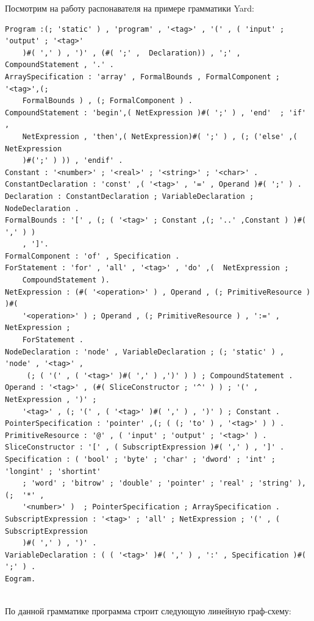 \documentclass[12pt]{article}
\begin{document}
Посмотрим на работу распонавателя на примере грамматики Yard:
\begin{verbatim}
Program :(; 'static' ) , 'program' , '<tag>' , '(' , ( 'input' ; 'output' ; '<tag>' 
	)#( ',' ) , ')' , (#( ';' ,  Declaration)) , ';' , CompoundStatement , '.' .
ArraySpecification : 'array' , FormalBounds , FormalComponent ; '<tag>',(; 	
	FormalBounds ) , (; FormalComponent ) . 
CompoundStatement : 'begin',( NetExpression )#( ';' ) , 'end'  ; 'if' , 	
	NetExpression , 'then',( NetExpression)#( ';' ) , (; ('else' ,( NetExpression 
	)#(';' ) )) , 'endif' .
Constant : '<number>' ; '<real>' ; '<string>' ; '<char>' .
ConstantDeclaration : 'const' ,( '<tag>' , '=' , Operand )#( ';' ) .
Declaration : ConstantDeclaration ; VariableDeclaration ; NodeDeclaration .
FormalBounds : '[' , (; ( '<tag>' ; Constant ,(; '..' ,Constant ) )#( ',' ) )
	, ']'.
FormalComponent : 'of' , Specification .
ForStatement : 'for' , 'all' , '<tag>' , 'do' ,(  NetExpression ; 
	CompoundStatement ).
NetExpression : (#( '<operation>' ) , Operand , (; PrimitiveResource ) )#(
	'<operation>' ) ; Operand , (; PrimitiveResource ) , ':=' , NetExpression ;
 	ForStatement .
NodeDeclaration : 'node' , VariableDeclaration ; (; 'static' ) , 'node' , '<tag>' ,
	 (; ( '(' , ( '<tag>' )#( ',' ) ,')' ) ) ; CompoundStatement .
Operand : '<tag>' , (#( SliceConstructor ; '^' ) ) ; '(' , NetExpression , ')' ;
 	'<tag>' , (; '(' , ( '<tag>' )#( ',' ) , ')' ) ; Constant . 
PointerSpecification : 'pointer' ,(; ( (; 'to' ) , '<tag>' ) ) .
PrimitiveResource : '@' , ( 'input' ; 'output' ; '<tag>' ) .
SliceConstructor : '[' , ( SubscriptExpression )#( ',' ) , ']' .
Specification : ( 'bool' ; 'byte' ; 'char' ; 'dword' ; 'int' ; 'longint' ; 'shortint'
 	; 'word' ; 'bitrow' ; 'double' ; 'pointer' ; 'real' ; 'string' ),(;  '*' ,
  	'<number>' )  ; PointerSpecification ; ArraySpecification .
SubscriptExpression : '<tag>' ; 'all' ; NetExpression ; '(' , ( SubscriptExpression 
	)#( ',' ) , ')' .
VariableDeclaration : ( ( '<tag>' )#( ',' ) , ':' , Specification )#( ';' ) .
Eogram.


\end{verbatim}


По данной грамматике программа строит следующую линейную граф-схему:\\
\end{document}
